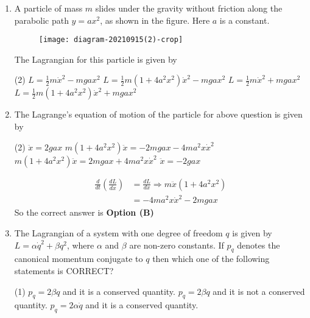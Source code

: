 \begin{enumerate}
	\item A particle of mass $m$ slides under the gravity without friction along the parabolic path $y=a x^{2}$, as shown in the figure. Here $a$ is a constant.\\
	\begin{figure}[H]
		\centering
		\texttt{[image: diagram-20210915(2)-crop]}
	\end{figure}
	The Lagrangian for this particle is given by
	{	}
	\begin{tasks}(2)
		\task[\textbf{A.}] $L=\frac{1}{2} m \dot{x}^{2}-m g a x^{2}$
		\task[\textbf{B.}] $L=\frac{1}{2} m\left(1+4 a^{2} x^{2}\right) \dot{x}^{2}-m g a x^{2}$
		\task[\textbf{C.}] $L=\frac{1}{2} m \dot{x}^{2}+m g a x^{2}$
		\task[\textbf{D.}] $L=\frac{1}{2} m\left(1+4 a^{2} x^{2}\right) \dot{x}^{2}+m g a x^{2}$
	\end{tasks}
	\item  The Lagrange's equation of motion of the particle for above question is given by
	{}
	\begin{tasks}(2)
		\task[\textbf{A.}] $\ddot{x}=2 g a x$
		\task[\textbf{B.}] $m\left(1+4 a^{2} x^{2}\right) \ddot{x}=-2 m g a x-4 m a^{2} x \dot{x}^{2}$
		\task[\textbf{C.}] $m\left(1+4 a^{2} x^{2}\right) \ddot{x}=2 m g a x+4 m a^{2} x \dot{x}^{2}$
		\task[\textbf{D.}] $\ddot{x}=-2 g a x$
	\end{tasks}
	\begin{answer}
		\begin{align*}
		\frac{d}{d t}\left(\frac{d L}{d \dot{x}}\right)&=\frac{d L}{d x} \Rightarrow m \ddot{x}\left(1+4 a^{2} x^{2}\right)\\&=-4 m a^{2} x \dot{x}^{2}-2 m g a x
		\end{align*}
		So the correct answer is \textbf{Option (B)}
	\end{answer}	
	\item The Lagrangian of a system with one degree of freedom $q$ is given by $L=\alpha \dot{q}^{2}+\beta q^{2}$, where $\alpha$ and $\beta$ are non-zero constants. If $p_{q}$ denotes the canonical momentum conjugate to $q$ then which one of the following statements is CORRECT?
	{}
	\begin{tasks}(1)
		\task[\textbf{A.}] $p_{q}=2 \beta q$ and it is a conserved quantity.
		\task[\textbf{B.}]  $p_{q}=2 \beta q$ and it is not a conserved quantity.
		\task[\textbf{C.}] $p_{q}=2 \alpha \dot{q}$ and it is a conserved quantity.

\end{tasks}
\end{enumerate}
